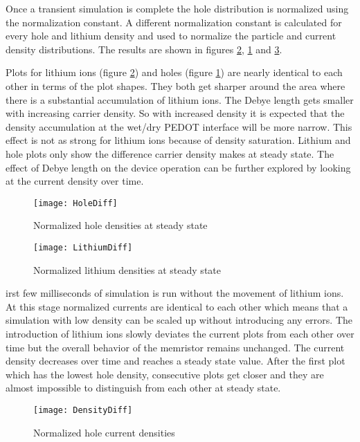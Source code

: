 \begin{doublespace}
Once a transient simulation is complete the hole distribution is normalized using the normalization constant. A different normalization constant is calculated for every hole and lithium density and used to normalize the particle and current density distributions. The results are shown in figures \ref{LithiumDiff}, \ref{HoleDiff} and \ref{DensityDiff}. 
 
Plots for lithium ions (figure \ref{LithiumDiff}) and holes (figure \ref{HoleDiff}) are nearly identical to each other in terms of the plot shapes. They both get sharper around the area where there is a substantial accumulation of lithium ions. The Debye length gets smaller with increasing carrier density. So with increased density it is expected that the density accumulation at the wet/dry PEDOT interface will be more narrow. This effect is not as strong for lithium ions because of density saturation. Lithium and hole plots only show the difference carrier density makes at steady state. The effect of Debye length on the device operation can be further explored by looking at the current density over time.   

\begin{figure}[!htp]
\centering
\texttt{[image: HoleDiff]}
\caption{Normalized hole densities at steady state} 
\label{HoleDiff}
\end{figure}

\begin{figure}[!htp]
\centering
\texttt{[image: LithiumDiff]}
\caption{Normalized lithium densities at steady state} 
\label{LithiumDiff}
\end{figure}

irst few milliseconds of  simulation is run without  the movement of lithium ions. At this stage normalized currents are identical to each other which means that a simulation with low density can be scaled up without introducing any errors. The introduction of lithium ions slowly deviates the current plots from each other over time but the overall behavior of the memristor remains unchanged. The current density decreases over time and reaches a steady state value. After the first plot which has the lowest hole density, consecutive plots get closer and they are almost impossible to distinguish from each other at steady state.

\begin{figure}[!htp]
\centering
\texttt{[image: DensityDiff]}
\caption{Normalized hole current densities} 
\label{DensityDiff}
\end{figure}


\end{doublespace}
